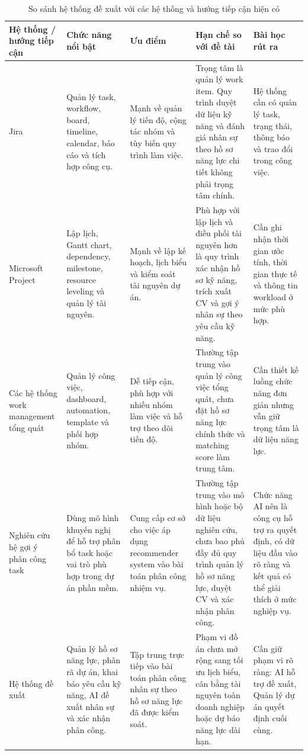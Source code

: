\documentclass[../DoAn.tex]{subfiles}
\begin{document}
\begin{table}[H]
    \centering
    \caption{So sánh hệ thống đề xuất với các hệ thống và hướng tiếp cận hiện có}
    \label{table:so_sanh_he_thong}
    \small
    \setlength{\tabcolsep}{3pt}
    \begin{tabular}{|>{\raggedright\arraybackslash}p{}|>{\raggedright\arraybackslash}p{}|>{\raggedright\arraybackslash}p{}|>{\raggedright\arraybackslash}p{}|>{\raggedright\arraybackslash}p{}|}
        \hline
        \textbf{Hệ thống / hướng tiếp cận} & \textbf{Chức năng nổi bật} & \textbf{Ưu điểm} & \textbf{Hạn chế so với đề tài} & \textbf{Bài học rút ra} \\ \hline
        Jira & Quản lý task, workflow, board, timeline, calendar, báo cáo và tích hợp công cụ. & Mạnh về quản lý tiến độ, cộng tác nhóm và tùy biến quy trình làm việc. & Trọng tâm là quản lý work item. Quy trình duyệt dữ liệu kỹ năng và đánh giá nhân sự theo hồ sơ năng lực chi tiết không phải trọng tâm chính. & Hệ thống cần có quản lý task, trạng thái, thông báo và trao đổi trong công việc. \\ \hline
        Microsoft Project & Lập lịch, Gantt chart, dependency, milestone, resource leveling và quản lý tài nguyên. & Mạnh về lập kế hoạch, lịch biểu và kiểm soát tài nguyên dự án. & Phù hợp với lập lịch và điều phối tài nguyên hơn là quy trình xác nhận hồ sơ kỹ năng, trích xuất CV và gợi ý nhân sự theo yêu cầu kỹ năng. & Cần ghi nhận thời gian ước tính, thời gian thực tế và thông tin workload ở mức phù hợp. \\ \hline
        Các hệ thống work management tổng quát & Quản lý công việc, dashboard, automation, template và phối hợp nhóm. & Dễ tiếp cận, phù hợp với nhiều nhóm làm việc và hỗ trợ theo dõi tiến độ. & Thường tập trung vào quản lý công việc tổng quát, chưa đặt hồ sơ năng lực chính thức và matching score làm trung tâm. & Cần thiết kế luồng chức năng đơn giản nhưng vẫn giữ trọng tâm là dữ liệu năng lực. \\ \hline
        Nghiên cứu hệ gợi ý phân công task & Dùng mô hình khuyến nghị để hỗ trợ phân bổ task hoặc vai trò phù hợp trong dự án phần mềm. & Cung cấp cơ sở cho việc áp dụng recommender system vào bài toán phân công nhiệm vụ. & Thường tập trung vào mô hình hoặc bộ dữ liệu nghiên cứu, chưa bao phủ đầy đủ quy trình quản lý hồ sơ năng lực, duyệt CV và xác nhận phân công. & Chức năng AI nên là công cụ hỗ trợ ra quyết định, có dữ liệu đầu vào rõ ràng và kết quả có thể giải thích ở mức nghiệp vụ. \\ \hline
        Hệ thống đề xuất & Quản lý hồ sơ năng lực, phân rã dự án, khai báo yêu cầu kỹ năng, AI đề xuất nhân sự và xác nhận phân công. & Tập trung trực tiếp vào bài toán phân công nhân sự theo hồ sơ năng lực đã được kiểm soát. & Phạm vi đồ án chưa mở rộng sang tối ưu lịch biểu, cân bằng tài nguyên toàn doanh nghiệp hoặc dự báo năng lực dài hạn. & Cần giữ phạm vi rõ ràng: AI hỗ trợ đề xuất, Quản lý dự án quyết định cuối cùng. \\ \hline
    \end{tabular}
\end{table}
\end{document}
